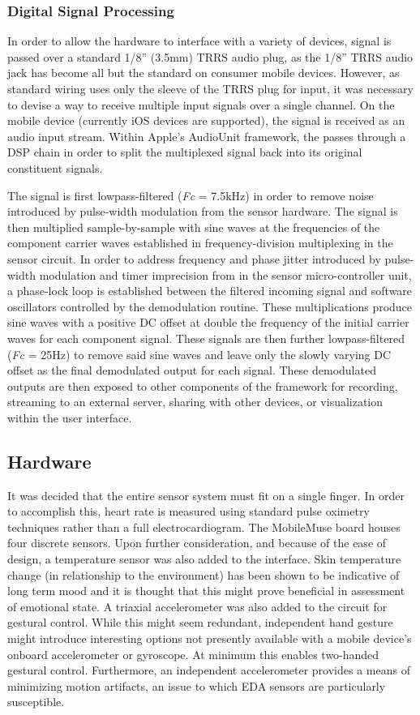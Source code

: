 \documentclass{sig-alternate}
\begin{document}
\subsubsection{Digital Signal Processing}
In order to allow the hardware to interface with a variety of devices, signal is passed over a standard 1/8'' (3.5mm) TRRS audio plug, as the 1/8'' TRRS audio jack has become all but the standard on consumer mobile devices.  However, as standard wiring uses only the sleeve of the TRRS plug for input, it was necessary to devise a way to receive multiple input signals over a single channel.  On the mobile device (currently iOS devices are supported), the signal is received as an audio input stream.  Within Apple's AudioUnit framework, the passes through a DSP chain in order to split the multiplexed signal back into its original constituent signals.

The signal is first lowpass-filtered (\textit{Fc} = 7.5kHz) in order to remove noise introduced by pulse-width modulation from the sensor hardware.  The signal is then multiplied sample-by-sample with sine waves at the frequencies of the component carrier waves established in frequency-division multiplexing in the sensor circuit.  In order to address frequency and phase jitter introduced by pulse-width modulation and timer imprecision from in the sensor micro-controller unit, a phase-lock loop is established between the filtered incoming signal and software oscillators controlled by the demodulation routine.  These multiplications produce sine waves with a positive DC offset at double the frequency of the initial carrier waves for each component signal.  These signals are then further lowpass-filtered (\textit{Fc} = 25Hz) to remove said sine waves and leave only the slowly varying DC offset as the final demodulated output for each signal.  These demodulated outputs are then exposed to other components of the framework for recording, streaming to an external server, sharing with other devices, or visualization within the user interface.

\subsection{Hardware}
It was decided that the entire sensor system must fit on a single finger. In order to accomplish this, heart rate is measured using standard pulse oximetry techniques rather than a full electrocardiogram. The MobileMuse board houses four discrete sensors. Upon further consideration, and because of the ease of design, a temperature sensor was also added to the interface. Skin temperature change (in relationship to the environment) has been shown to be indicative of long term mood and it is thought that this might prove beneficial in assessment of emotional state. A triaxial accelerometer was also added to the circuit for gestural control. While this might seem redundant, independent hand gesture might introduce interesting options not presently available with a mobile device's onboard accelerometer or gyroscope. At minimum this enables two-handed gestural control.  Furthermore, an independent accelerometer provides a means of minimizing motion artifacts, an issue to which EDA sensors are particularly susceptible.
\end{document}
